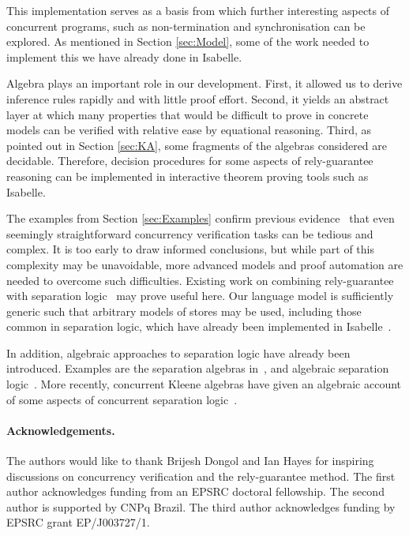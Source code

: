\documentclass{llncs}
\begin{document}
This implementation serves as a basis from which further interesting
aspects of concurrent programs, such as non-termination and
synchronisation can be explored. As mentioned in Section
\ref{sec:Model}, some of the work needed to implement this we have
already done in Isabelle.

Algebra plays an important role in our development. First, it
allowed us to derive inference rules rapidly and with little proof
effort. Second, it yields an abstract layer at which many properties
that would be difficult to prove in concrete models can be verified
with relative ease by equational reasoning. Third, as pointed out in
Section \ref{sec:KA}, some fragments of the algebras considered are
decidable. Therefore, decision procedures for some aspects of
rely-guarantee reasoning can be implemented in interactive theorem
proving tools such as Isabelle.

The examples from Section \ref{sec:Examples} confirm previous
evidence~\cite{nieto_rely-guarantee_2003} that even seemingly
straightforward concurrency verification tasks can be tedious and complex. It is
too early to draw informed conclusions, but while part of this complexity
may be unavoidable, more advanced models and proof automation are
needed to overcome such difficulties. Existing work on combining
rely-guarantee with separation logic~\cite{vafeiadis_modular_2008} may
prove useful here. Our language model is sufficiently generic such
that arbitrary models of stores may be used, including those common in
separation logic, which have already been implemented in Isabelle~\cite{klein_mechanised_2012}.

In addition, algebraic approaches to separation logic have already
been introduced. Examples are the separation algebras
in~\cite{calcagno_local_2007}, and algebraic separation
logic~\cite{dang_algebraic_2011}. More recently, concurrent Kleene
algebras have given an algebraic account of some aspects of concurrent
separation logic~\cite{hoare_concurrent_2011,hoare_locality_2011}.

\paragraph*{Acknowledgements.} The authors would like to thank Brijesh
Dongol and Ian Hayes for inspiring discussions on concurrency
verification and the rely-guarantee method. The first author
acknowledges funding from an EPSRC doctoral fellowship. The second
author is supported by CNPq Brazil. The third
author acknowledges funding by EPSRC grant EP/J003727/1.

{}

\end{document}
